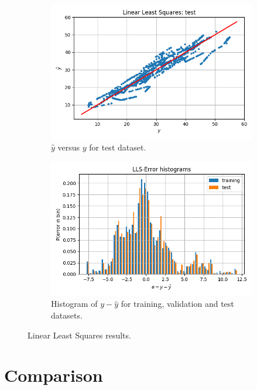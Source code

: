 \documentclass[12pt]{article}
\begin{document}
\begin{figure}
\centering
\begin{subfigure}{0.45\textwidth}
\includegraphics[width=\textwidth]{regression.png}  
\caption{$\hat{y}$ versus $y$ for test dataset.}
\label{fig:LLS_regr}
\end{subfigure}
\begin{subfigure}{0.45\textwidth}
\includegraphics[width=\textwidth]{hist_err.png}    
\caption{Histogram of $y-\hat{y}$ for training, validation and test datasets.}
\label{fig:LLS_hist}
\end{subfigure}
\caption{Linear Least Squares results.}
\label{fig:LLS}
\end{figure}


\section{Comparison}
\end{document}
